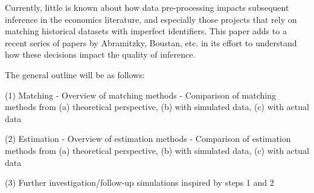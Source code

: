 \documentclass[12pt]{article}
\begin{document}
Currently, little is known about how data pre-processing impacts subsequent inference in the economics literature, and especially those projects that rely on matching historical datasets with imperfect identifiers.  This paper adds to a recent series of papers by Abramitzky, Boustan, etc.  in its effort to understand how these decisions impact the quality of inference. 

The general outline will be as follows:

(1) Matching 
- Overview of matching methods
- Comparison of matching methods from (a) theoretical perspective, (b) with simulated data, (c) with actual data

(2) Estimation 
- Overview of estimation methods
- Comparison of estimation methods from (a) theoretical perspective, (b) with simulated data, (c) with actual data

(3) Further investigation/follow-up simulations inspired by steps 1 and 2  








\end{document}
